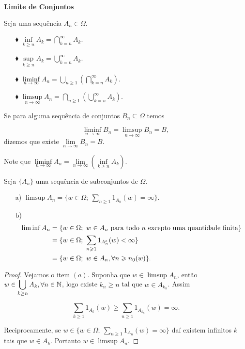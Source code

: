 \vspace*{1cm}
\textbf{Limite de Conjuntos}

Seja uma sequência $A_n \in \Omega$.
\begin{enumerate}
\item[$\blacklozenge$] $\inf \limits_{k\geqslant n} A_k = \displaystyle\bigcap_{k=n}^{\infty}{A_k}$.
\item[$\blacklozenge$] $\sup \limits_{k\geqslant n} A_k = \displaystyle\bigcup_{k=n}^{\infty}{A_k}$.
\item[$\blacklozenge$] 
	$\liminf \limits_{n \to \infty} A_n 
	= 
	\displaystyle\bigcup_ {n\geqslant 1} \left(\displaystyle\bigcap_{k=n}^{\infty}{A_k} \right)$.
\item[$\blacklozenge$] 
	$\limsup \limits_{n \to \infty} A_n 
	= 
	\displaystyle\bigcap_ {n\geqslant 1} \left(\displaystyle\bigcup_{k=n}^{\infty}{A_k} \right)$.
\end{enumerate}

\begin{definicao}
	Se para alguma sequência de conjuntos $B_n \subseteq \Omega$ temos

	$$
		\liminf \limits_{n \to \infty} B_n = \limsup \limits_{n \to \infty} B_n = B,
	$$	
	dizemos que existe $\lim \limits_{n \to \infty} B_n =B$.
\end{definicao}

Note que $\liminf \limits_{n\to \infty}A_n 
			=
			\lim \limits_{n\to \infty}\left(\inf \limits_{k\geqslant n}A_k \right)
		 $.


\begin{lema}
Seja $\{A_n\}$ uma sequência de subconjuntos de $\Omega$.
\begin{enumerate}
\item[a)] $\limsup A_n = \{ w \in \Omega;\ \sum_{n \geqslant 1} 1_{A_n}(w)= \infty \}$.
\item[b)] 
\begin{align*}
\vspace*{-2cm}
\liminf A_n & = \{ w \in \Omega;\ w \in A_n \text{ para todo $n$ excepto uma quantidade finita} \} \\
			& = \{w \in \Omega;\ \sum_{n\geqslant 1} 1_{A_n^c}(w) < \infty \} \\
			& = \{w \in \Omega;\ w \in A_n, \forall n \geqslant n_0(w) \}. 
\end{align*} 
\end{enumerate}
\end{lema}

\begin{proof}
Vejamos o item $(a)$. Suponha que $w \in \limsup A_n$, então $w \in \displaystyle\bigcup_{k \geq n} A_k,
\forall n \in \mathbb{N}$, logo existe $k_n \geqslant n$ tal que $w \in A_{k_n}$. Assim

	$$
		\sum \limits_{k \geqslant 1} 1_{A_k}(w) \geqslant \sum \limits_{n\geqslant 1} 1_{A_{k_n}}(w) 
		= 
		\infty.
	$$

Reciprocamente, se $ w \in \{ w \in \Omega;\ \sum_{n \geqslant 1} 1_{A_n}(w)= \infty \}$ daí existem 
infinitos $k$ tais que $w \in A_k$. Portanto $w \in \limsup A_n$.
\end{proof}

